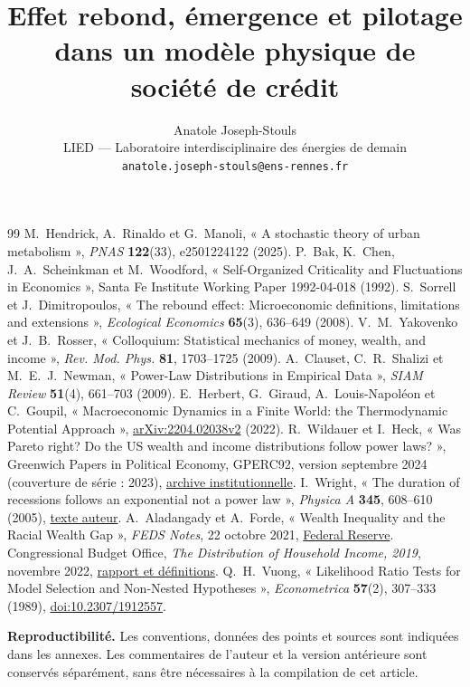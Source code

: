 \documentclass[10pt,a4paper,twocolumn]{article}
\title{\vspace{-1.2cm}Effet rebond, émergence et pilotage\\[2pt]
dans un modèle physique de société de crédit}
\author{Anatole Joseph-Stouls\\
\small LIED --- Laboratoire interdisciplinaire des énergies de demain\\
\small \texttt{anatole.joseph-stouls@ens-rennes.fr}}
\date{}
\begin{document}
\maketitle
\vspace{-0.7cm}

\FloatBarrier
\clearpage
\begin{thebibliography}{99}\small
{} M.~Hendrick, A.~Rinaldo et G.~Manoli,
  « A stochastic theory of urban metabolism », \emph{PNAS} \textbf{122}(33),
  e2501224122 (2025).
 P.~Bak, K.~Chen, J.~A.~Scheinkman et M.~Woodford,
  « Self-Organized Criticality and Fluctuations in Economics »,
  Santa Fe Institute Working Paper 1992-04-018 (1992).
 S.~Sorrell et J.~Dimitropoulos,
  « The rebound effect: Microeconomic definitions, limitations and extensions »,
  \emph{Ecological Economics} \textbf{65}(3), 636--649 (2008).
 V.~M.~Yakovenko et J.~B.~Rosser,
  « Colloquium: Statistical mechanics of money, wealth, and income »,
  \emph{Rev. Mod. Phys.} \textbf{81}, 1703--1725 (2009).
 A.~Clauset, C.~R.~Shalizi et M.~E.~J.~Newman,
  « Power-Law Distributions in Empirical Data », \emph{SIAM Review}
  \textbf{51}(4), 661--703 (2009).
 E.~Herbert, G.~Giraud, A.~Louis-Napoléon et C.~Goupil,
  « Macroeconomic Dynamics in a Finite World: the Thermodynamic Potential
  Approach », \href{https://arxiv.org/abs/2204.02038v2}{arXiv:2204.02038v2} (2022).
 R.~Wildauer et I.~Heck,
  « Was Pareto right? Do the US wealth and income distributions follow power
  laws? », Greenwich Papers in Political Economy, GPERC92, version septembre
  2024 (couverture de série : 2023),
  \href{https://gala.gre.ac.uk/id/eprint/38597/}{archive institutionnelle}.
 I.~Wright, « The duration of recessions follows an
  exponential not a power law », \emph{Physica A} \textbf{345}, 608--610
  (2005), \href{https://arxiv.org/abs/cond-mat/0311585}{texte auteur}.
 A.~Aladangady et A.~Forde, « Wealth Inequality and the
  Racial Wealth Gap », \emph{FEDS Notes}, 22 octobre 2021,
  \href{https://www.federalreserve.gov/econres/notes/feds-notes/wealth-inequality-and-the-racial-wealth-gap-20211022.html}{Federal Reserve}.
 Congressional Budget Office, \emph{The Distribution of
  Household Income, 2019}, novembre 2022,
  \href{https://www.cbo.gov/publication/58781}{rapport et définitions}.
 Q.~H.~Vuong, « Likelihood Ratio Tests for Model Selection
  and Non-Nested Hypotheses », \emph{Econometrica} \textbf{57}(2),
  307--333 (1989), \href{https://doi.org/10.2307/1912557}{doi:10.2307/1912557}.
\end{thebibliography}

\noindent\textbf{Reproductibilité.} Les conventions, données des points et
sources sont indiquées dans les annexes. Les commentaires de l'auteur et
la version antérieure sont conservés séparément, sans être nécessaires à
la compilation de cet article.
\clearpage

\end{document}
